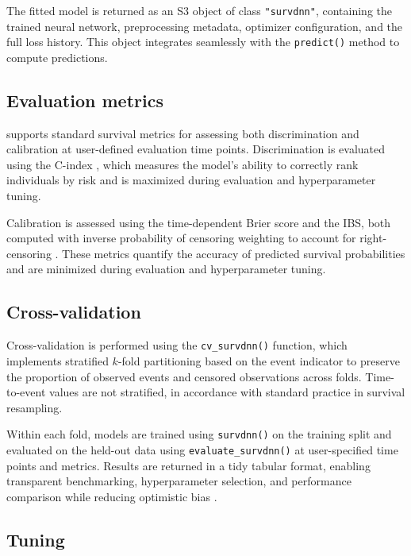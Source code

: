 The fitted model is returned as an S3 object of class \texttt{"survdnn"}, containing the trained neural network, preprocessing metadata, optimizer configuration, and the full loss history. This object integrates seamlessly with the \texttt{predict()} method to compute predictions.

\subsection{Evaluation metrics}\label{evaluation-metrics}

 supports standard survival metrics for assessing both discrimination and calibration at user-defined evaluation time points. Discrimination is evaluated using the C-index \citep{harrell1982evaluating}, which measures the model's ability to correctly rank individuals by risk and is maximized during evaluation and hyperparameter tuning.

Calibration is assessed using the time-dependent Brier score \citep{graf1999assessment} and the IBS, both computed with inverse probability of censoring weighting to account for right-censoring \citep{zhou2023survmetrics}. These metrics quantify the accuracy of predicted survival probabilities and are minimized during evaluation and hyperparameter tuning.

\subsection{Cross-validation}\label{cross-validation}

Cross-validation is performed using the \texttt{cv\_survdnn()} function, which implements stratified \(k\)-fold partitioning based on the event indicator to preserve the proportion of observed events and censored observations across folds. Time-to-event values are not stratified, in accordance with standard practice in survival resampling.

Within each fold, models are trained using \texttt{survdnn()} on the training split and evaluated on the held-out data using \texttt{evaluate\_survdnn()} at user-specified time points and metrics. Results are returned in a tidy tabular format, enabling transparent benchmarking, hyperparameter selection, and performance comparison while reducing optimistic bias \citep{varma2006bias}.

\subsection{Tuning}\label{tuning}

